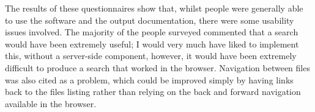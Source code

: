 The results of these questionnaires show that, whilst people were generally able
to use the software and the output documentation, there were some usability
issues involved. The majority of the people surveyed commented that a search
would have been extremely useful; I would very much have liked to implement
this, without a server-side component, however, it would have been extremely
difficult to produce a search that worked in the browser. Navigation between
files was also cited as a problem, which could be improved simply by having
links back to the files listing rather than relying on the back and forward
navigation available in the browser.




















